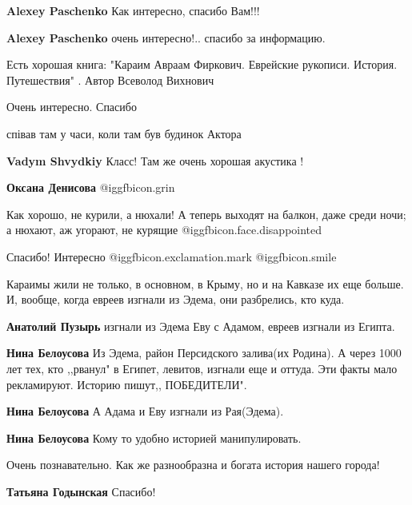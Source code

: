 \begin{itemize}
\begin{itemize}
\textbf{Alexey Paschenko} Как интересно, спасибо Вам!!!

\textbf{Alexey Paschenko} очень интересно!.. спасибо за информацию.
\end{itemize} %

Есть хорошая книга: "Караим Авраам Фиркович. Еврейские рукописи. История. Путешествия" .
Автор Всеволод Вихнович

Очень интересно. Спасибо

співав там у часи, коли там був будинок Актора

\begin{itemize} %
\textbf{Vadym Shvydkiy} Класс! Там же очень хорошая акустика !

\textbf{Оксана Денисова}  @igg{fbicon.grin} 
\end{itemize} %

Как хорошо, не курили, а нюхали! А теперь выходят на балкон, даже среди ночи; а нюхают, аж угорают, не курящие  @igg{fbicon.face.disappointed} 

Спасибо! Интересно @igg{fbicon.exclamation.mark} @igg{fbicon.smile} 


Караимы жили не только, в основном, в Крыму, но и на Кавказе их еще
больше. И, вообще, когда евреев изгнали из Эдема, они разбрелись, кто куда.

\begin{itemize} %
\textbf{Анатолий Пузырь} изгнали из Эдема Еву с Адамом, евреев изгнали из Египта.

\textbf{Нина Белоусова} Из Эдема, район Персидского залива(их Родина).
А через 1000 лет тех, кто ,,рванул" в Египет, левитов, изгнали еще и оттуда.
Эти факты мало рекламируют.
Историю пишут,, ПОБЕДИТЕЛИ".

\textbf{Нина Белоусова} А Адама и Еву изгнали из Рая(Эдема).

\textbf{Нина Белоусова} Кому то удобно историей манипулировать.
\end{itemize} %

Очень познавательно. Как же разнообразна и богата история нашего города!

\begin{itemize} %
\textbf{Татьяна Годынская} Спасибо!
\end{itemize} %


\end{itemize}
